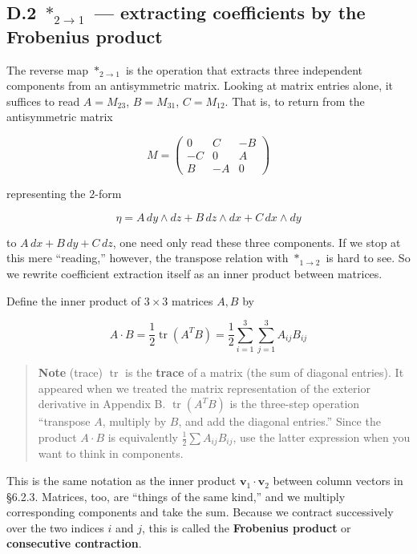 \hypertarget{d.2-ast_2to1-extracting-coefficients-by-the-frobenius-product}{%
\subsection{\texorpdfstring{D.2 \(\ast_{2\to1}\) --- extracting
coefficients by the Frobenius
product}{D.2 \textbackslash ast\_\{2\textbackslash to1\} --- extracting coefficients by the Frobenius product}}\label{d.2-ast_2to1-extracting-coefficients-by-the-frobenius-product}}

The reverse map \(\ast_{2\to1}\) is the operation that extracts three
independent components from an antisymmetric matrix. Looking at matrix
entries alone, it suffices to read \(A=M_{23}\), \(B=M_{31}\),
\(C=M_{12}\). That is, to return from the antisymmetric matrix

\[
M=
\begin{pmatrix}
0 & C & -B \\
-C & 0 & A \\
B & -A & 0
\end{pmatrix}
\]

representing the \(2\)-form

\[
\eta
=
A\,dy\wedge dz
+
B\,dz\wedge dx
+
C\,dx\wedge dy
\]

to \(A\,dx+B\,dy+C\,dz\), one need only read these three components. If
we stop at this mere ``reading,'' however, the transpose relation with
\(\ast_{1\to2}\) is hard to see. So we rewrite coefficient extraction
itself as an inner product between matrices.

Define the inner product of \(3\times3\) matrices \(A,B\) by

\[
A\cdot B
=
\frac{1}{2}\operatorname{tr}(A^T B)
=
\frac{1}{2}
\sum_{i=1}^{3}
\sum_{j=1}^{3}
A_{ij}B_{ij}
\]

\begin{quote}
\textbf{Note} (trace) \(\operatorname{tr}\) is the \textbf{trace} of a
matrix (the sum of diagonal entries). It appeared when we treated the
matrix representation of the exterior derivative in Appendix B.
\(\operatorname{tr}(A^T B)\) is the three-step operation ``transpose
\(A\), multiply by \(B\), and add the diagonal entries.'' Since the
product \(A\cdot B\) is equivalently \(\frac{1}{2}\sum A_{ij}B_{ij}\),
use the latter expression when you want to think in components.
\end{quote}

This is the same notation as the inner product
\(\mathbf{v}_1 \cdot \mathbf{v}_2\) between column vectors in §6.2.3.
Matrices, too, are ``things of the same kind,'' and we multiply
corresponding components and take the sum. Because we contract
successively over the two indices \(i\) and \(j\), this is called the
\textbf{Frobenius product} or \textbf{consecutive contraction}.

